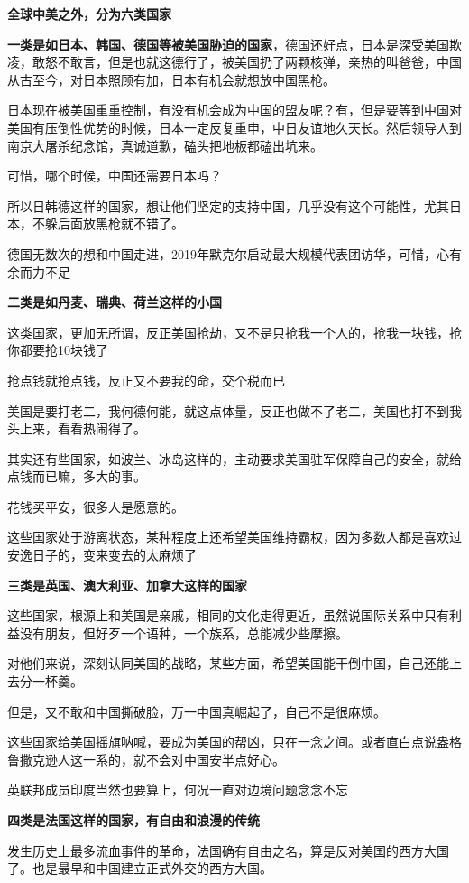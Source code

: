 \documentclass[UTF8, 11pt, oneside]{ctexart}
\newcommand{\zd}[1]{\textbf{\textcolor[RGB]{123,12,0}{#1}}} %
\begin{document}
\zd{全球中美之外，分为六类国家}

\zd{一类是如日本、韩国、德国等被美国胁迫的国家}，德国还好点，日本是深受美国欺凌，敢怒不敢言，但是也就这德行了，被美国扔了两颗核弹，亲热的叫爸爸，中国从古至今，对日本照顾有加，日本有机会就想放中国黑枪。

日本现在被美国重重控制，有没有机会成为中国的盟友呢？有，但是要等到中国对美国有压倒性优势的时候，日本一定反复重申，中日友谊地久天长。然后领导人到南京大屠杀纪念馆，真诚道歉，磕头把地板都磕出坑来。

可惜，哪个时候，中国还需要日本吗？

所以日韩德这样的国家，想让他们坚定的支持中国，几乎没有这个可能性，尤其日本，不躲后面放黑枪就不错了。

德国无数次的想和中国走进，2019年默克尔启动最大规模代表团访华，可惜，心有余而力不足

\zd{二类是如丹麦、瑞典、荷兰这样的小国}

这类国家，更加无所谓，反正美国抢劫，又不是只抢我一个人的，抢我一块钱，抢你都要抢10块钱了

抢点钱就抢点钱，反正又不要我的命，交个税而已

美国是要打老二，我何德何能，就这点体量，反正也做不了老二，美国也打不到我头上来，看看热闹得了。

其实还有些国家，如波兰、冰岛这样的，主动要求美国驻军保障自己的安全，就给点钱而已嘛，多大的事。

花钱买平安，很多人是愿意的。

这些国家处于游离状态，某种程度上还希望美国维持霸权，因为多数人都是喜欢过安逸日子的，变来变去的太麻烦了

\zd{三类是英国、澳大利亚、加拿大这样的国家}

这些国家，根源上和美国是亲戚，相同的文化走得更近，虽然说国际关系中只有利益没有朋友，但好歹一个语种，一个族系，总能减少些摩擦。

对他们来说，深刻认同美国的战略，某些方面，希望美国能干倒中国，自己还能上去分一杯羹。

但是，又不敢和中国撕破脸，万一中国真崛起了，自己不是很麻烦。

这些国家给美国摇旗呐喊，要成为美国的帮凶，只在一念之间。或者直白点说盎格鲁撒克逊人这一系的，就不会对中国安半点好心。

英联邦成员印度当然也要算上，何况一直对边境问题念念不忘

\zd{四类是法国这样的国家，有自由和浪漫的传统}

发生历史上最多流血事件的革命，法国确有自由之名，算是反对美国的西方大国了。也是最早和中国建立正式外交的西方大国。
\end{document}

